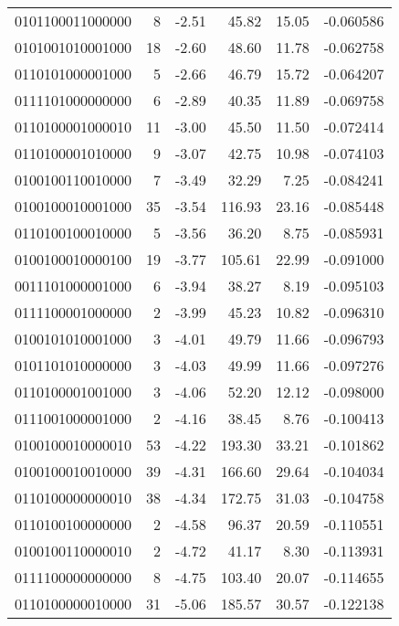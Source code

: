 \begin{tabular}{lrrrrr}
0101100011000000 &         8 &     -2.51 &    45.82 &    15.05 & -0.060586 \\
0101001010001000 &        18 &     -2.60 &    48.60 &    11.78 & -0.062758 \\
0110101000001000 &         5 &     -2.66 &    46.79 &    15.72 & -0.064207 \\
0111101000000000 &         6 &     -2.89 &    40.35 &    11.89 & -0.069758 \\
0110100001000010 &        11 &     -3.00 &    45.50 &    11.50 & -0.072414 \\
0110100001010000 &         9 &     -3.07 &    42.75 &    10.98 & -0.074103 \\
0100100110010000 &         7 &     -3.49 &    32.29 &     7.25 & -0.084241 \\
0100100010001000 &        35 &     -3.54 &   116.93 &    23.16 & -0.085448 \\
0110100100010000 &         5 &     -3.56 &    36.20 &     8.75 & -0.085931 \\
0100100010000100 &        19 &     -3.77 &   105.61 &    22.99 & -0.091000 \\
0011101000001000 &         6 &     -3.94 &    38.27 &     8.19 & -0.095103 \\
0111100001000000 &         2 &     -3.99 &    45.23 &    10.82 & -0.096310 \\
0100101010001000 &         3 &     -4.01 &    49.79 &    11.66 & -0.096793 \\
0101101010000000 &         3 &     -4.03 &    49.99 &    11.66 & -0.097276 \\
0110100001001000 &         3 &     -4.06 &    52.20 &    12.12 & -0.098000 \\
0111001000001000 &         2 &     -4.16 &    38.45 &     8.76 & -0.100413 \\
0100100010000010 &        53 &     -4.22 &   193.30 &    33.21 & -0.101862 \\
0100100010010000 &        39 &     -4.31 &   166.60 &    29.64 & -0.104034 \\
0110100000000010 &        38 &     -4.34 &   172.75 &    31.03 & -0.104758 \\
0110100100000000 &         2 &     -4.58 &    96.37 &    20.59 & -0.110551 \\
0100100110000010 &         2 &     -4.72 &    41.17 &     8.30 & -0.113931 \\
0111100000000000 &         8 &     -4.75 &   103.40 &    20.07 & -0.114655 \\
0110100000010000 &        31 &     -5.06 &   185.57 &    30.57 & -0.122138 \\

\end{tabular}

